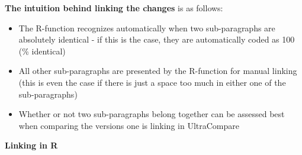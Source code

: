 \documentclass[10pt,]{article}
\providecommand{\tightlist}{%
  \setlength{\itemsep}{0pt}\setlength{\parskip}{0pt}}
\begin{document}
\textbf{The intuition behind linking the changes} is as follows:

\begin{itemize}
\tightlist
\item
  The R-function recognizes automatically when two sub-paragraphs are
  absolutely identical - if this is the case, they are automatically
  coded as 100 (\% identical)
\item
  All other sub-paragraphs are presented by the R-function for manual
  linking (this is even the case if there is just a space too much in
  either one of the sub-paragraphs)
\item
  Whether or not two sub-paragraphs belong together can be assessed best
  when comparing the versions one is linking in UltraCompare
\end{itemize}

\textbf{Linking in R}
\end{document}
